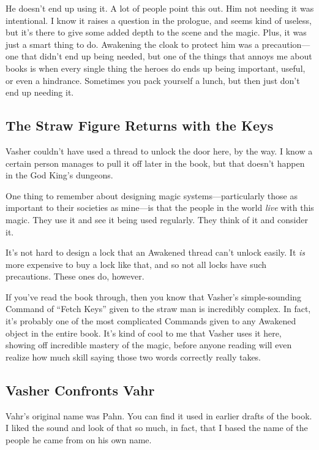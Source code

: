 He doesn’t end up using it. A lot of people point this out. Him not needing it was intentional. I know it raises a question in the prologue, and seems kind of useless, but it’s there to give some added depth to the scene and the magic. Plus, it was just a smart thing to do. Awakening the cloak to protect him was a precaution—one that didn’t end up being needed, but one of the things that annoys me about books is when every single thing the heroes do ends up being important, useful, or even a hindrance. Sometimes you pack yourself a lunch, but then just don’t end up needing it.

\subsection*{The Straw Figure Returns with the Keys}

Vasher couldn’t have used a thread to unlock the door here, by the way. I know a certain person manages to pull it off later in the book, but that doesn’t happen in the God King’s dungeons.

One thing to remember about designing magic systems—particularly those as important to their societies as mine—is that the people in the world \textit{live} with this magic. They use it and see it being used regularly. They think of it and consider it.

It’s not hard to design a lock that an Awakened thread can’t unlock easily. It \textit{is} more expensive to buy a lock like that, and so not all locks have such precautions. These ones do, however.

If you’ve read the book through, then you know that Vasher’s simple-sounding Command of “Fetch Keys” given to the straw man is incredibly complex. In fact, it’s probably one of the most complicated Commands given to any Awakened object in the entire book. It’s kind of cool to me that Vasher uses it here, showing off incredible mastery of the magic, before anyone reading will even realize how much skill saying those two words correctly really takes.

\subsection*{Vasher Confronts Vahr}

Vahr’s original name was Pahn. You can find it used in earlier drafts of the book. I liked the sound and look of that so much, in fact, that I based the name of the people he came from on his own name.


